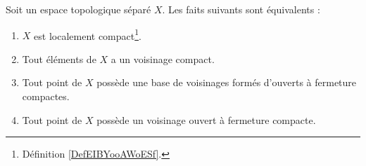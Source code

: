 \begin{proposition}	\label{PROPooVLOZooLlYNNa}
	Soit un espace topologique séparé \( X\). Les faits suivants sont équivalents :
	\begin{enumerate}
		\item		\label{ITEMooZLNUooHcTakl}
		      \( X\) est localement compact\footnote{Définition \ref{DefEIBYooAWoESf}.}.
		\item		\label{ITEMooYMKMooUkcNzd}
		      Tout éléments de \( X\) a un voisinage compact.
		\item		\label{ITEMooXYYHooTCZMJr}
		      Tout point de \( X\) possède une base de voisinages formés d'ouverts à fermeture compactes.
		\item		\label{ITEMooBTECooDDsTuo}
		      Tout point de \( X\) possède un voisinage ouvert à fermeture compacte.
	\end{enumerate}
\end{proposition}

